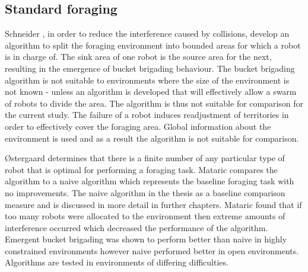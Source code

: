 

\subsection{Standard foraging}


Schneider \cite{schneider1998territorial}, in order to reduce the interference caused by collisions, develop an algorithm to split the foraging environment into bounded areas for which a robot is in charge of. The sink area of one robot is the source area for the next, resulting in the emergence of bucket brigading behaviour. The bucket brigading algorithm is not suitable to environments where the size of the environment is not known - unless an algorithm is developed that will effectively allow a swarm of robots to divide the area. The algorithm is thus not suitable for comparison for the current study. The failure of a robot induces readjustment of territories in order to effectively cover the foraging area. Global information about the environment is used and as a result the algorithm is not suitable for comparison. %

\O stergaard \cite{ostergaard2001emergent} determines that there is a finite number of any particular type of robot that is optimal for performing a foraging task. Mataric compares the algorithm to a naive algorithm which represents the baseline foraging task with no improvements. The naive algorithm in the thesis as a baseline comparison measure and is discussed in more detail in further chapters. Mataric found that if too many robots were allocated to the environment then extreme amounts of interference occurred which decreased the performance of the algorithm. Emergent bucket brigading was shown to perform better than naive in highly constrained environments however naive performed better in open environments. Algorithms are tested in environments of differing difficulties. %


